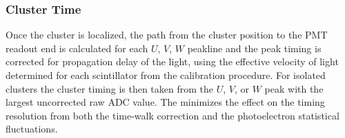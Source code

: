\subsubsection {Cluster Time}

Once the cluster is localized, the path from the cluster position to the PMT readout end is calculated for each $U$, $V$,
$W$ peakline and the peak timing is corrected for propagation delay of the light, using the effective velocity of light
determined for each scintillator from the calibration procedure.  For isolated clusters the cluster timing is then taken from
the $U$, $V$, or $W$ peak with the largest uncorrected raw ADC value.  The minimizes the effect on the timing resolution
from both the time-walk correction and the photoelectron statistical fluctuations.
